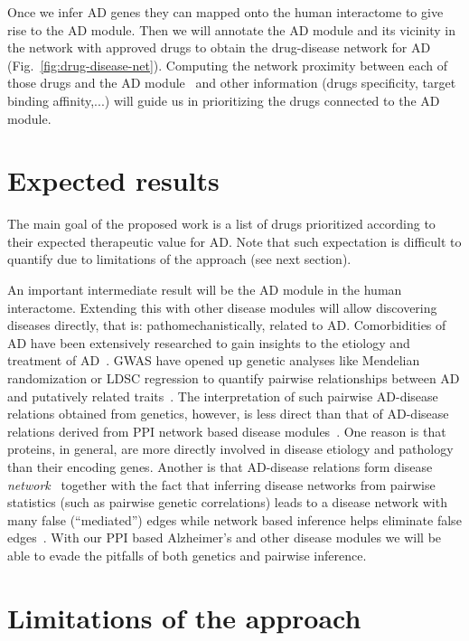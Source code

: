 \documentclass[letterpaper]{article}
\begin{document}
Once we infer AD genes they can mapped onto the human interactome to give rise
to the AD module.  Then we will annotate the AD module and its vicinity in the
network with approved drugs to obtain the drug-disease network for AD
(Fig.~\ref{fig:drug-disease-net}).  Computing the network proximity between
each of those drugs and the AD module~\citep{Cheng2018} and other information
(drugs specificity, target binding affinity,...) will guide us in prioritizing
the drugs connected to the AD module.

\section{Expected results}

The main goal of the proposed work is a list of drugs prioritized according to
their expected therapeutic value for AD.  Note that such expectation is
difficult to quantify due to limitations of the approach (see next section).

An important intermediate result will be the AD module in the human
interactome.  Extending this with other disease modules will allow discovering
diseases directly, that is: pathomechanistically, related to AD.
Comorbidities of AD have been extensively researched to gain insights to the
etiology and treatment of AD~\citep{Santiago2021}.  GWAS have opened up
genetic analyses like Mendelian randomization or LDSC regression to quantify
pairwise relationships between AD and putatively related
traits~\citep{Jansen2019,Kunkle2019}.  The interpretation of such pairwise AD-disease
relations obtained from genetics, however, is less direct than that of
AD-disease relations derived from PPI network based disease
modules~\citep{Menche2015a}.  One reason is that proteins, in general, are more directly
involved in disease etiology and pathology than their encoding genes.  Another
is that AD-disease relations form disease \emph{network}~\citep{Menche2015a}
together with the fact that inferring disease networks from pairwise
statistics (such as pairwise genetic correlations) leads to a disease network with
many false (``mediated'') edges while network based inference helps eliminate
false edges~\citep{Marx2017}.  With our PPI based Alzheimer's and other
disease modules we will be able to evade the pitfalls of both genetics and pairwise
inference.

\section{Limitations of the approach}
\end{document}
